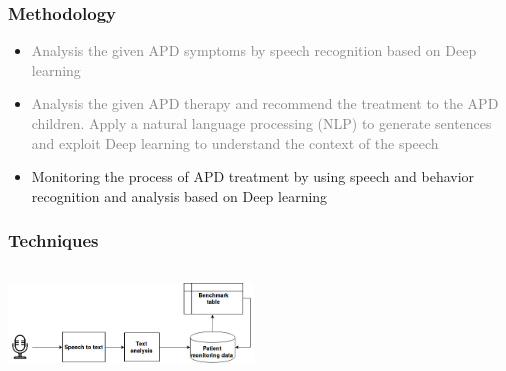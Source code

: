 \documentclass{beamer}
\begin{document}
\begin{frame}
	\frametitle{Methodology}
	\begin{itemize}
		\item \textcolor{gray}{Analysis  the  given  APD  symptoms  by  speech  
			recognition  based  on  Deep  learning}
		\item \textcolor{gray} {Analysis  the  given  APD  therapy  and  recommend  the 	treatment  to  the  APD  children.  Apply  a  natural  language 	processing  (NLP)  to  generate  sentences  and  exploit  Deep 	learning  to  understand  the  context  of  the  speech}
		
		\item Monitoring  the  process  of  APD  treatment  by  using  speech 	and  behavior  recognition  and  analysis  based  on  Deep learning
		
	\end{itemize}

\end{frame}

\begin{frame}
	\frametitle{Techniques}
	
	\begin{column}{.7\textwidth}
			\includegraphics[width=65mm]{f4.jpg}
	\end{column}
	\begin{column}{.3\textwidth}
		
	
		
	\end{column}
\end{frame}



\end{document}
